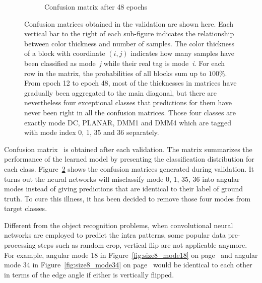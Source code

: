 \begin{figure}
\begin{subfigure}[t]{0.49\textwidth}
        \caption{Confusion matrix after 48 epochs}
        \label{fig:imgd}   
    \end{subfigure}
\caption[Confusion matrices obtained in the validation]
{Confusion matrices obtained in the validation are shown here.
Each vertical bar to the right of each sub-figure
indicates the relationship between color thickness 
and number of samples.
The color thickness of a block with coordinate \((i,j)\)
indicates how many samples have been classified as mode~\emph{j}
while their real tag is mode~\emph{i}.
For each row in the matrix, 
the probabilities of all blocks sum up to \(100\% \).
From epoch 12 to epoch 48, most of the thicknesses 
in matrices have gradually been aggregated to 
the main diagonal, but there are nevertheless
four exceptional classes that predictions for them
have never been right in all the confusion matrices.
Those four classes are exactly mode DC, PLANAR, 
DMM1 and DMM4 which are tagged with mode index 
0, 1, 35 and 36 separately.}
\label{fig:main}
\end{figure}


Confusion matrix~\parencite{RN216} is obtained after 
each validation.
The matrix summarizes the performance of the 
learned model by presenting the 
classification distribution for each class.
Figure~\ref{fig:main} shows the 
confusion matrices generated during
validation.
It turns out the neural networks will misclassify 
mode 0, 1, 35, 36 into angular modes instead of giving 
predictions that are identical to their label 
of ground truth.
To cure this illness, it has been decided to
remove those four modes from target classes.

Different from the object recognition problems,
when convolutional neural networks are employed to 
predict the intra patterns, some popular data pre-processing
steps such as random crop, vertical flip
are not applicable anymore.
For example, angular mode 18 in Figure~\ref{fig:size8_mode18}
on page~\pageref{fig:size8_mode18} and angular mode 34 in
Figure~\ref{fig:size8_mode34} on page~\pageref{fig:size8_mode34}
would be identical to each other in terms of the edge angle
if either is vertically flipped.

